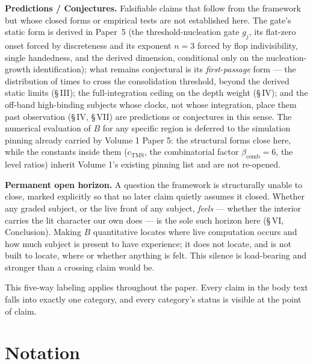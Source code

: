 \documentclass[11pt,oneside]{report}
\theoremstyle{definition}
\theoremstyle{remark}
\begin{document}
\textbf{Predictions / Conjectures.} Falsifiable claims that follow from
the framework but whose closed forms or empirical tests are not
established here. The gate's static form is derived in Paper~5 (the
threshold-nucleation gate \ensuremath{g_j}, its flat-zero onset forced by discreteness and its
exponent \ensuremath{n=3} forced by flop indivisibility, single handedness, and the derived
dimension, conditional only on the nucleation-growth identification); what remains
conjectural is its
\emph{first-passage} form --- the distribution of times to cross the
consolidation threshold, beyond the derived static limits (\S\,III); the
full-integration ceiling on the depth weight
(\S\,IV); and the off-band high-binding subjects whose clocks, not whose
integration, place them past observation (\S\,IV, \S\,VII) are predictions
or conjectures in this sense. The numerical evaluation of \ensuremath{B}
for any specific region is deferred to the simulation pinning already
carried by Volume 1 Paper 5: the structural forms close here, while the
constants inside them (\ensuremath{c_{\mathrm{TMS}}}, the combinatorial
factor \ensuremath{\beta_{\mathrm{comb}} = 6}, the level ratios) inherit
Volume 1's existing pinning list and are not re-opened.

\textbf{Permanent open horizon.} A question the framework is structurally
unable to close, marked explicitly so that no later claim quietly assumes
it closed. Whether any graded subject, or the live front of any subject,
\emph{feels} --- whether the interior carries the lit character our own
does --- is the sole such horizon here (\S\,VI, Conclusion). Making
\ensuremath{B} quantitative locates where live computation occurs and how
much subject is present to have experience; it does not locate, and is not
built to locate, where or whether anything is felt. This silence is
load-bearing and stronger than a crossing claim would be.

This five-way labeling applies throughout the paper. Every claim in the
body text falls into exactly one category, and every category's status is
visible at the point of claim.

\section*{Notation}
\end{document}
